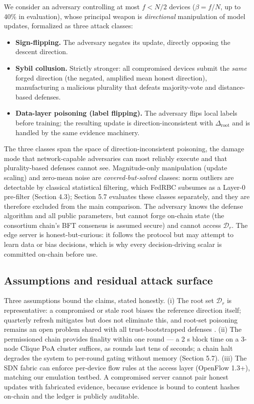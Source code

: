 \documentclass[cmc,article,submit,moreauthors,pdftex]{Definitions/tsp}
\begin{document}
We consider an adversary controlling at most $f < N/2$ devices ($\beta = f/N$, up to 40\% in evaluation), whose principal weapon is \emph{directional} manipulation of model updates, formalized as three attack classes:

\begin{itemize}
\item \textbf{Sign-flipping.} The adversary negates its update, directly opposing the descent direction.
\item \textbf{Sybil collusion.} Strictly stronger: all compromised devices submit the \emph{same} forged direction (the negated, amplified mean honest direction), manufacturing a malicious plurality that defeats majority-vote and distance-based defenses.
\item \textbf{Data-layer poisoning (label flipping).} The adversary flips local labels before training; the resulting update is direction-inconsistent with $\Delta_{\mathrm{root}}$ and is handled by the same evidence machinery.
\end{itemize}

The three classes span the space of direction-inconsistent poisoning, the damage mode that network-capable adversaries can most reliably execute and that plurality-based defenses cannot see. Magnitude-only manipulation (update scaling) and zero-mean noise are \emph{covered-but-solved} classes: norm outliers are detectable by classical statistical filtering, which FedRBC subsumes as a Layer-0 pre-filter (Section 4.3); Section 5.7 evaluates these classes separately, and they are therefore excluded from the main comparison. The adversary knows the defense algorithm and all public parameters, but cannot forge on-chain state (the consortium chain's BFT consensus is assumed secure) and cannot access $\mathcal{D}_r$. The edge server is honest-but-curious: it follows the protocol but may attempt to learn data or bias decisions, which is why every decision-driving scalar is committed on-chain before use.

\subsection{Assumptions and residual attack surface}\label{sec:assumptions-and-residual-attack-surface}

Three assumptions bound the claims, stated honestly. (i) The root set $\mathcal{D}_r$ is representative: a compromised or stale root biases the reference direction itself; quarterly refresh mitigates but does not eliminate this, and root-set poisoning remains an open problem shared with all trust-bootstrapped defenses \cite{ref-37}. (ii) The permissioned chain provides finality within one round --- a 2 s block time on a 3-node Clique PoA cluster suffices, as rounds last tens of seconds; a chain halt degrades the system to per-round gating without memory (Section 5.7). (iii) The SDN fabric can enforce per-device flow rules at the access layer (OpenFlow 1.3+), matching our emulation testbed. A compromised server cannot pair honest updates with fabricated evidence, because evidence is bound to content hashes on-chain and the ledger is publicly auditable.
\end{document}
